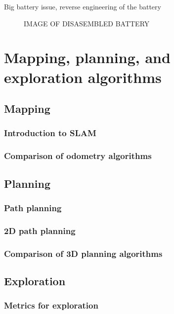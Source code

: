 \documentclass[11pt]{article}
\begin{document}
            Big battery issue, reverse engineering of the battery

            \begin{figure}[H]
                \centering
                IMAGE OF DISASEMBLED BATTERY
            \end{figure}

        \newpage

    \section{Mapping, planning, and exploration algorithms}

        \subsection{Mapping}
            \subsubsection{Introduction to SLAM}
            \subsubsection{Comparison of odometry algorithms}

        \subsection{Planning}
            \subsubsection{Path planning}
            \subsubsection{2D path planning}
            \subsubsection{Comparison of 3D planning algorithms}

        \subsection{Exploration}
            \subsubsection{Metrics for exploration}
\end{document}
